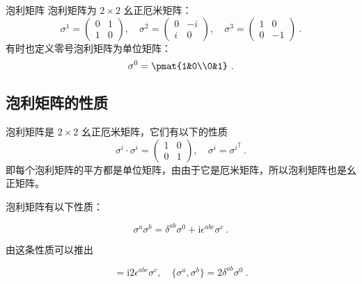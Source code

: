 \begin{definition}{泡利矩阵}\label{def_pauliM_1}
泡利矩阵为 $2\times 2$ 幺正厄米矩阵：
\begin{equation}
\sigma^1 = \begin{pmatrix}
0 & 1\\
1 & 0
\end{pmatrix},\quad 
\sigma^2 = \begin{pmatrix}
0 & -i\\
i & 0
\end{pmatrix},\quad 
\sigma^3 = 
\begin{pmatrix}
1 & 0\\
0 & -1
\end{pmatrix}
~.
\end{equation}
有时也定义零号泡利矩阵为单位矩阵：
\begin{equation}
\sigma^0 = \pmat{1&0\\0&1}~.
\end{equation}

\end{definition}

\subsection{泡利矩阵的性质}
泡利矩阵是 $2\times 2$ 幺正厄米矩阵，它们有以下的性质
\begin{equation}
\sigma^i\cdot \sigma^i = \begin{pmatrix}1&0\\0&1\end{pmatrix},\quad \sigma^i = {\sigma^i}^\dagger~.
\end{equation}
即每个泡利矩阵的平方都是单位矩阵，由由于它是厄米矩阵，所以泡利矩阵也是幺正矩阵。

泡利矩阵有以下性质：
\begin{theorem}{}
\begin{equation}\label{eq_pauliM_1}
\sigma^a\sigma^b = \delta^{ab}\sigma^0 + \mathrm{i}\epsilon^{abc}\sigma^c~.
\end{equation}
\end{theorem}
由这条性质可以推出
\begin{lemma}{}
\begin{equation}
[\sigma^a,\sigma^b] = \mathrm{i}2\epsilon^{abc}\sigma^c,\quad \{\sigma^a,\sigma^b\}=2\delta^{ab}\sigma^0~.
\end{equation}

\end{lemma}
